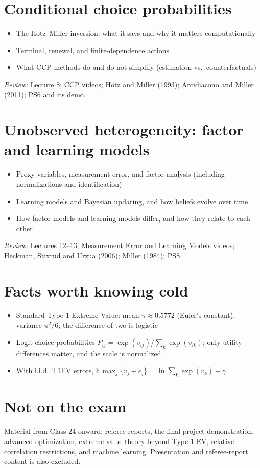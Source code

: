 \documentclass[11pt]{article}
\newcommand{\review}[1]{\par\smallskip\textit{Review:} #1}
\begin{document}
\section{Conditional choice probabilities}
\begin{itemize}
\item The Hotz--Miller inversion: what it says and why it matters computationally
\item Terminal, renewal, and finite-dependence actions
\item What CCP methods do and do not simplify (estimation vs.\ counterfactuals)
\end{itemize}
\review{Lecture 8; CCP videos; Hotz and Miller (1993); Arcidiacono and Miller (2011); PS6 and its demo.}

\section{Unobserved heterogeneity: factor and learning models}
\begin{itemize}
\item Proxy variables, measurement error, and factor analysis (including normalizations and identification)
\item Learning models and Bayesian updating, and how beliefs evolve over time
\item How factor models and learning models differ, and how they relate to each other
\end{itemize}
\review{Lectures 12--13; Measurement Error and Learning Models videos; Heckman, Stixrud and Urzua (2006); Miller (1984); PS8.}

\section{Facts worth knowing cold}
\begin{itemize}
\item Standard Type 1 Extreme Value: mean $\gamma\approx 0.5772$ (Euler's constant), variance $\pi^2/6$; the difference of two is logistic
\item Logit choice probabilities $P_{ij} = \exp(v_{ij})/\sum_k \exp(v_{ik})$; only utility differences matter, and the scale is normalized
\item With i.i.d.\ T1EV errors, $\mathbb{E}\max_j\{v_j+\epsilon_j\} = \ln\sum_k\exp(v_k) + \gamma$
\end{itemize}

\section{Not on the exam}
Material from Class 24 onward: referee reports, the final-project demonstration, advanced optimization, extreme value theory beyond Type 1 EV, relative correlation restrictions, and machine learning. Presentation and referee-report content is also excluded.
\end{document}
